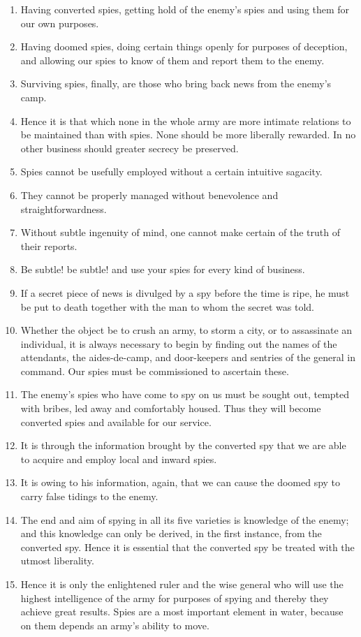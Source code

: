 \documentclass[oneside]{book}
\begin{document}
\begin{enumerate}
	\item Having converted spies, getting hold of the enemy's spies and using them for our own purposes.
	\item Having doomed spies, doing certain things openly for purposes of deception, and allowing our spies to know of them and report them to the enemy.
	\item Surviving spies, finally, are those who bring back news from the enemy's camp.
	\item Hence it is that which none in the whole army are more intimate relations to be maintained than with spies. None should be more liberally rewarded. In no other business should greater secrecy be preserved.
	\item Spies cannot be usefully employed without a certain intuitive sagacity.
	\item They cannot be properly managed without benevolence and straightforwardness.
	\item Without subtle ingenuity of mind, one cannot make certain of the truth of their reports.
	\item Be subtle! be subtle! and use your spies for every kind of business.
	\item If a secret piece of news is divulged by a spy before the time is ripe, he must be put to death together with the man to whom the secret was told.
	\item Whether the object be to crush an army, to storm a city, or to assassinate an individual, it is always necessary to begin by finding out the names of the attendants, the aides-de-camp, and door-keepers and sentries of the general in command. Our spies must be commissioned to ascertain these.
	\item The enemy's spies who have come to spy on us must be sought out, tempted with bribes, led away and comfortably housed. Thus they will become converted spies and available for our service.
	\item It is through the information brought by the converted spy that we are able to acquire and employ local and inward spies.
	\item It is owing to his information, again, that we can cause the doomed spy to carry false tidings to the enemy.
	\item The end and aim of spying in all its five varieties is knowledge of the enemy; and this knowledge can only be derived, in the first instance, from the converted spy. Hence it is essential that the converted spy be treated with the utmost liberality.
	\item Hence it is only the enlightened ruler and the wise general who will use the highest intelligence of the army for purposes of spying and thereby they achieve great results. Spies are a most important element in water, because on them depends an army's ability to move.
\end{enumerate}
\end{document}
